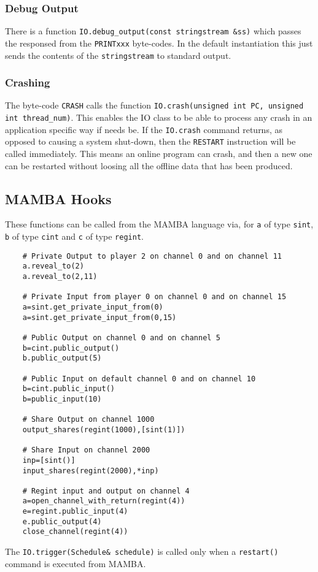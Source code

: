\subsubsection{Debug Output}
There is a function \verb+IO.debug_output(const stringstream &ss)+
which passes the responsed from the \verb+PRINTxxx+ byte-codes.
In the default instantiation this just sends the contents
of the \verb+stringstream+ to standard output.

\subsubsection{Crashing}
The byte-code \verb+CRASH+ calls the function
\verb+IO.crash(unsigned int PC, unsigned int thread_num)+.
This enables the IO class to be able to process any crash
in an application specific way if needs be.
If the \verb+IO.crash+ command returns, as opposed to causing
a system shut-down, then the \verb+RESTART+ instruction will
be called immediately.
This means an online program can crash, and then a new one
can be restarted without loosing all the offline data that
has been produced.

\subsection{MAMBA Hooks}
These functions can be called from the MAMBA language via,
for \verb+a+ of type \verb+sint+, \verb+b+ of type \verb+cint+
and \verb+c+ of type \verb+regint+.
\begin{verbatim}
    # Private Output to player 2 on channel 0 and on channel 11
    a.reveal_to(2)
    a.reveal_to(2,11)

    # Private Input from player 0 on channel 0 and on channel 15
    a=sint.get_private_input_from(0)
    a=sint.get_private_input_from(0,15)

    # Public Output on channel 0 and on channel 5
    b=cint.public_output()
    b.public_output(5)

    # Public Input on default channel 0 and on channel 10
    b=cint.public_input()
    b=public_input(10)

    # Share Output on channel 1000
    output_shares(regint(1000),[sint(1)])

    # Share Input on channel 2000
    inp=[sint()]
    input_shares(regint(2000),*inp)

    # Regint input and output on channel 4
    a=open_channel_with_return(regint(4))
    e=regint.public_input(4)
    e.public_output(4)
    close_channel(regint(4))
\end{verbatim}
The \verb+IO.trigger(Schedule& schedule)+ is called only when a \verb+restart()+ command
is executed from MAMBA.
